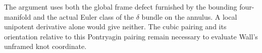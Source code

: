 \begin{remark}[Scope]
The argument uses both the global frame defect furnished by
the bounding four-manifold and the actual Euler class of the
$\delta$ bundle on the annulus. A local unipotent derivative
alone would give neither. The cubic pairing and its orientation
relative to this Pontryagin pairing remain necessary to
evaluate Wall's unframed knot coordinate.
\end{remark}
